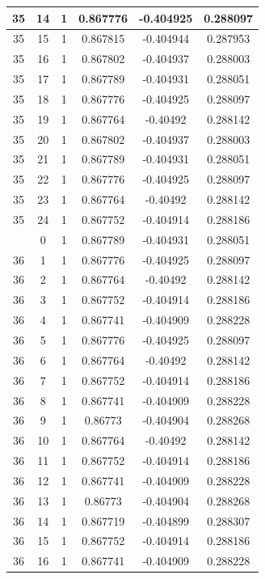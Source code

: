 \documentclass[12pt,a4paper]{article}
\numberwithin{equation}{section}
\numberwithin{figure}{section}
\numberwithin{table}{section}
\begin{document}
\begin{longtable}{|c|c|c|c|c|c|}
35 & 14 & 1 & 0.867776 & -0.404925 & 0.288097 \\ \hline
35 & 15 & 1 & 0.867815 & -0.404944 & 0.287953 \\ \hline
35 & 16 & 1 & 0.867802 & -0.404937 & 0.288003 \\ \hline
35 & 17 & 1 & 0.867789 & -0.404931 & 0.288051 \\ \hline
35 & 18 & 1 & 0.867776 & -0.404925 & 0.288097 \\ \hline
35 & 19 & 1 & 0.867764 & -0.40492 & 0.288142 \\ \hline
35 & 20 & 1 & 0.867802 & -0.404937 & 0.288003 \\ \hline
35 & 21 & 1 & 0.867789 & -0.404931 & 0.288051 \\ \hline
35 & 22 & 1 & 0.867776 & -0.404925 & 0.288097 \\ \hline
35 & 23 & 1 & 0.867764 & -0.40492 & 0.288142 \\ \hline
35 & 24 & 1 & 0.867752 & -0.404914 & 0.288186 \\ \hline
\pagebreak
36 & 0 & 1 & 0.867789 & -0.404931 & 0.288051 \\ \hline
36 & 1 & 1 & 0.867776 & -0.404925 & 0.288097 \\ \hline
36 & 2 & 1 & 0.867764 & -0.40492 & 0.288142 \\ \hline
36 & 3 & 1 & 0.867752 & -0.404914 & 0.288186 \\ \hline
36 & 4 & 1 & 0.867741 & -0.404909 & 0.288228 \\ \hline
36 & 5 & 1 & 0.867776 & -0.404925 & 0.288097 \\ \hline
36 & 6 & 1 & 0.867764 & -0.40492 & 0.288142 \\ \hline
36 & 7 & 1 & 0.867752 & -0.404914 & 0.288186 \\ \hline
36 & 8 & 1 & 0.867741 & -0.404909 & 0.288228 \\ \hline
36 & 9 & 1 & 0.86773 & -0.404904 & 0.288268 \\ \hline
36 & 10 & 1 & 0.867764 & -0.40492 & 0.288142 \\ \hline
36 & 11 & 1 & 0.867752 & -0.404914 & 0.288186 \\ \hline
36 & 12 & 1 & 0.867741 & -0.404909 & 0.288228 \\ \hline
36 & 13 & 1 & 0.86773 & -0.404904 & 0.288268 \\ \hline
36 & 14 & 1 & 0.867719 & -0.404899 & 0.288307 \\ \hline
36 & 15 & 1 & 0.867752 & -0.404914 & 0.288186 \\ \hline
36 & 16 & 1 & 0.867741 & -0.404909 & 0.288228 \\ \hline

\end{longtable}
\end{document}
